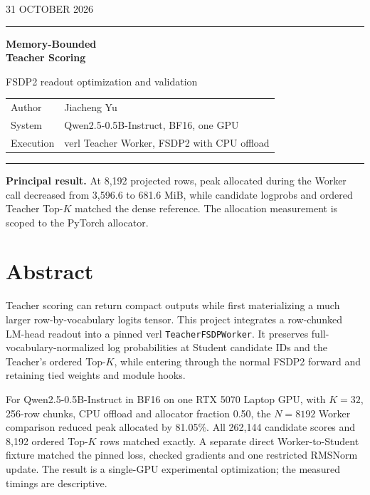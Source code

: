 \documentclass[11pt,a4paper]{article}
\newcommand{\code}[1]{{\small\nolinkurl{#1}}}
\begin{document}
\hypersetup{pageanchor=false}
\begin{titlepage}
\thispagestyle{empty}
\vspace*{9mm}
\hfill{\small 31 OCTOBER 2026}\par
\vspace{3mm}\hrule height 1pt
\vspace{22mm}
{\fontsize{28}{35}\selectfont\bfseries Memory-Bounded\\[1mm]Teacher Scoring\par}
\vspace{7mm}
{\large FSDP2 readout optimization and validation\par}
\vspace{17mm}
\begin{tabularx}{\linewidth}{@{}p{34mm}Y@{}}
Author & Jiacheng Yu\\
System & Qwen2.5-0.5B-Instruct, BF16, one GPU\\
Execution & verl Teacher Worker, FSDP2 with CPU offload\\
\end{tabularx}
\vfill
\hrule\vspace{5mm}
{\small\textbf{Principal result.} At 8,192 projected rows, peak allocated during the Worker call decreased from 3,596.6 to 681.6 MiB, while candidate logprobs and ordered Teacher Top-$K$ matched the dense reference. The allocation measurement is scoped to the PyTorch allocator.}\par
\vspace{6mm}
\end{titlepage}
\hypersetup{pageanchor=true}

\section*{Abstract}
Teacher scoring can return compact outputs while first materializing a much larger row-by-vocabulary logits tensor. This project integrates a row-chunked LM-head readout into a pinned verl \code{TeacherFSDPWorker}. It preserves full-vocabulary-normalized log probabilities at Student candidate IDs and the Teacher's ordered Top-$K$, while entering through the normal FSDP2 forward and retaining tied weights and module hooks.

For Qwen2.5-0.5B-Instruct in BF16 on one RTX 5070 Laptop GPU, with $K=32$, 256-row chunks, CPU offload and allocator fraction 0.50, the $N=8192$ Worker comparison reduced peak allocated by 81.05\%. All 262,144 candidate scores and 8,192 ordered Top-$K$ rows matched exactly. A separate direct Worker-to-Student fixture matched the pinned loss, checked gradients and one restricted RMSNorm update. The result is a single-GPU experimental optimization; the measured timings are descriptive.
\tableofcontents
\clearpage
\end{document}
